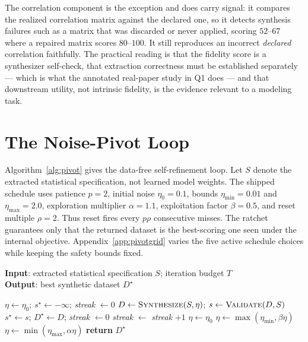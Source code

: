 \documentclass[letterpaper]{article} %
\begin{document}
The correlation component is the exception and does carry signal: it compares
the realized correlation matrix against the declared one, so it detects
synthesis failures such as a matrix that was discarded or never applied,
scoring $52$--$67$ where a repaired matrix scores $80$--$100$. It still
reproduces an incorrect \emph{declared} correlation faithfully. The practical
reading is that the fidelity score is a synthesizer self-check, that extraction
correctness must be established separately --- which is what the annotated
real-paper study in Q1 does --- and that downstream utility, not intrinsic
fidelity, is the evidence relevant to a modeling task.

\section{The Noise-Pivot Loop}
\label{app:noisepivot}
Algorithm~\ref{alg:pivot} gives the data-free self-refinement loop. Let $S$
denote the extracted statistical specification, not learned model weights. The
shipped schedule uses patience $p{=}2$, initial noise $\eta_0{=}0.1$, bounds
$\eta_{\min}{=}0.01$ and $\eta_{\max}{=}2.0$, exploration multiplier
$\alpha{=}1.1$, exploitation factor $\beta{=}0.5$, and reset multiple
$\rho{=}2$. Thus reset fires every $p\rho$ consecutive misses. The ratchet
guarantees only that the returned dataset is the best-scoring one seen under
the internal objective. Appendix~\ref{app:pivotgrid} varies the five active
schedule choices while keeping the safety bounds fixed.

\begin{algorithm}[t]
\caption{Noise-Pivot Self-Refinement}
\label{alg:pivot}
\textbf{Input}: extracted statistical specification $S$; iteration budget $T$\\
\textbf{Output}: best synthetic dataset $D^\star$
\begin{algorithmic}[1]
\STATE $\eta \gets \eta_0$; \; $s^\star \gets -\infty$; \; \textit{streak} $\gets 0$
  \STATE $D \gets \textsc{Synthesize}(S, \eta)$; \; $s \gets \textsc{Validate}(D, S)$
    \STATE $s^\star \gets s$; \; $D^\star \gets D$; \; \textit{streak} $\gets 0$ 
  \ELSE
    \STATE \textit{streak} $\gets$ \textit{streak} $+ 1$
      \STATE $\eta \gets \eta_0$ 
      \STATE $\eta \gets \max(\eta_{\min}, \beta\eta)$ 
    \ELSE
      \STATE $\eta \gets \min(\eta_{\max}, \alpha\eta)$ 
    \ENDIF
  \ENDIF
\ENDFOR
\STATE \textbf{return} $D^\star$
\end{algorithmic}
\end{algorithm}
\end{document}
